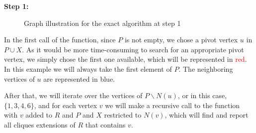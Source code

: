 \begin{minipage}{\linewidth}
    \textbf{Step 1:}

    \begin{minipage}{0.4\textwidth}
        \begin{figure}[H]
            \centering
            \caption{Graph illustration for the exact algorithm at step 1}
            \label{fig:exact-mewc-step1}
        \end{figure}
    \end{minipage}
    \hspace{0.04\linewidth}
    \begin{minipage}{0.55\textwidth}
        In the first call of the function, since $P$ is not empty, we chose a
        pivot vertex $u$ in $P\cup X$. As it would be more time-consuming to
        search for an appropriate pivot vertex, we simply chose the first one
        available, which will be represented in \textcolor{red}{red}. In this
        example we will always take the first element of $P$. The neighboring
        vertices of $u$ are represented in \textcolor{Cerulean}{blue}. \bigskip

        After that, we will iterate over the vertices of $P\backslash N(u)$,
        or in this case, $\{1,3,4,6\}$, and for each vertex $v$ we will make a
        recursive call to the function with $v$ added to $R$ and $P$ and $X$
        restricted to $N(v)$, which will find and report all cliques extensions
        of $R$ that contains $v$. \bigskip
    \end{minipage}
\end{minipage} \bigskip

